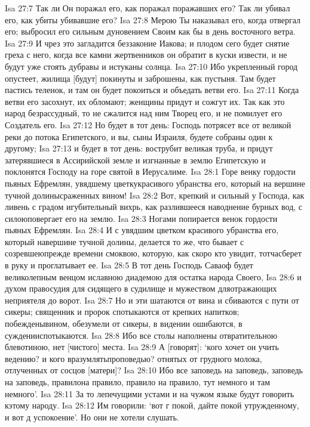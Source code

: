 Isa 27:7  Так ли Он поражал его, как поражал поражавших его? Так ли убивал его, как убиты убивавшие его?
Isa 27:8  Мерою Ты наказывал его, когда отвергал его; выбросил его сильным дуновением Своим как бы в день восточного ветра.
Isa 27:9  И чрез это загладится беззаконие Иакова; и плодом сего будет снятие греха с него, когда все камни жертвенников он обратит в куски извести, и не будут уже стоять дубравы и истуканы солнца.
Isa 27:10  Ибо укрепленный город опустеет, жилища [будут] покинуты и заброшены, как пустыня. Там будет пастись теленок, и там он будет покоиться и объедать ветви его.
Isa 27:11  Когда ветви его засохнут, их обломают; женщины придут и сожгут их. Так как это народ безрассудный, то не сжалится над ним Творец его, и не помилует его Создатель его.
Isa 27:12  Но будет в тот день: Господь потрясет все от великой реки до потока Египетского, и вы, сыны Израиля, будете собраны один к другому;
Isa 27:13  и будет в тот день: вострубит великая труба, и придут затерявшиеся в Ассирийской земле и изгнанные в землю Египетскую и поклонятся Господу на горе святой в Иерусалиме.
Isa 28:1  Горе венку гордости пьяных Ефремлян, увядшему цветкукрасивого убранства его, который на вершине тучной долинысраженных вином!
Isa 28:2  Вот, крепкий и сильный у Господа, как ливень с градом игубительный вихрь, как разлившееся наводнение бурных вод, с силоюповергает его на землю.
Isa 28:3  Ногами попирается венок гордости пьяных Ефремлян.
Isa 28:4  И с увядшим цветком красивого убранства его, который навершине тучной долины, делается то же, что бывает с созревшеюпрежде времени смоквою, которую, как скоро кто увидит, тотчасберет в руку и проглатывает ее.
Isa 28:5  В тот день Господь Саваоф будет великолепным венцом иславною диадемою для остатка народа Своего,
Isa 28:6  и духом правосудия для сидящего в судилище и мужеством дляотражающих неприятеля до ворот.
Isa 28:7  Но и эти шатаются от вина и сбиваются с пути от сикеры; священник и пророк спотыкаются от крепких напитков; побежденывином, обезумели от сикеры, в видении ошибаются, в сужденииспотыкаются.
Isa 28:8  Ибо все столы наполнены отвратительною блевотиною, нет [чистого] места.
Isa 28:9  А [говорят]: `кого хочет он учить ведению? и кого вразумлятьпроповедью? отнятых от грудного молока, отлученных от сосцов [матери]?
Isa 28:10  Ибо все заповедь на заповедь, заповедь на заповедь, правилона правило, правило на правило, тут немного и там немного'.
Isa 28:11  За то лепечущими устами и на чужом языке будут говорить кэтому народу.
Isa 28:12  Им говорили: `вот г покой, дайте покой утружденному, и вот д успокоение'. Но они не хотели слушать.

